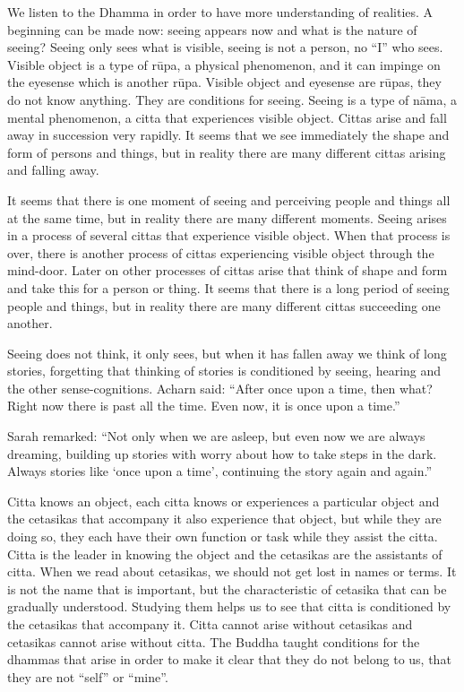 We listen to the Dhamma in order to have more understanding of
realities. A beginning can be made now: seeing appears now and what is
the nature of seeing? Seeing only sees what is visible, seeing is not a
person, no ``I'' who sees. Visible object is a type of rūpa, a physical
phenomenon, and it can impinge on the eyesense which is another rūpa.
Visible object and eyesense are rūpas, they do not know anything. They
are conditions for seeing. Seeing is a type of nāma, a mental
phenomenon, a citta that experiences visible object. Cittas arise and
fall away in succession very rapidly. It seems that we see immediately
the shape and form of persons and things, but in reality there are many
different cittas arising and falling away.

It seems that there is one moment of seeing and perceiving people and
things all at the same time, but in reality there are many different
moments. Seeing arises in a process of several cittas that experience
visible object. When that process is over, there is another process of
cittas experiencing visible object through the mind-door. Later on other
processes of cittas arise that think of shape and form and take this for
a person or thing. It seems that there is a long period of seeing people
and things, but in reality there are many different cittas succeeding
one another.

Seeing does not think, it only sees, but when it has fallen away we
think of long stories, forgetting that thinking of stories is
conditioned by seeing, hearing and the other sense-cognitions. Acharn
said: ``After once upon a time, then what? Right now there is past all
the time. Even now, it is once upon a time.''

Sarah remarked: ``Not only when we are asleep, but even now we are
always dreaming, building up stories with worry about how to take steps
in the dark. Always stories like `once upon a time', continuing the
story again and again.''

Citta knows an object, each citta knows or experiences a particular
object and the cetasikas that accompany it also experience that object,
but while they are doing so, they each have their own function or task
while they assist the citta. Citta is the leader in knowing the object
and the cetasikas are the assistants of citta. When we read about
cetasikas, we should not get lost in names or terms. It is not the name
that is important, but the characteristic of cetasika that can be
gradually understood. Studying them helps us to see that citta is
conditioned by the cetasikas that accompany it. Citta cannot arise
without cetasikas and cetasikas cannot arise without citta. The Buddha
taught conditions for the dhammas that arise in order to make it clear
that they do not belong to us, that they are not ``self'' or ``mine''.

